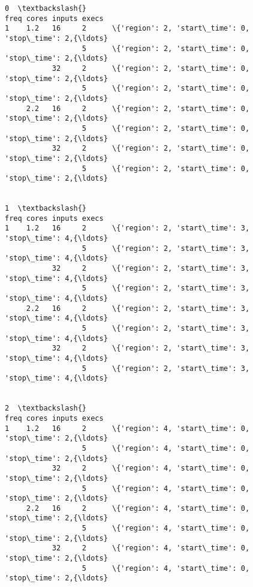 \documentclass[11pt]{article}
\begin{document}
    \begin{Verbatim}[commandchars=\\\{\}]
                                                                         0  \textbackslash{}
freq cores inputs execs
1    1.2   16     2      \{'region': 2, 'start\_time': 0, 'stop\_time': 2,{\ldots}
                  5      \{'region': 2, 'start\_time': 0, 'stop\_time': 2,{\ldots}
           32     2      \{'region': 2, 'start\_time': 0, 'stop\_time': 2,{\ldots}
                  5      \{'region': 2, 'start\_time': 0, 'stop\_time': 2,{\ldots}
     2.2   16     2      \{'region': 2, 'start\_time': 0, 'stop\_time': 2,{\ldots}
                  5      \{'region': 2, 'start\_time': 0, 'stop\_time': 2,{\ldots}
           32     2      \{'region': 2, 'start\_time': 0, 'stop\_time': 2,{\ldots}
                  5      \{'region': 2, 'start\_time': 0, 'stop\_time': 2,{\ldots}

                                                                         1  \textbackslash{}
freq cores inputs execs
1    1.2   16     2      \{'region': 2, 'start\_time': 3, 'stop\_time': 4,{\ldots}
                  5      \{'region': 2, 'start\_time': 3, 'stop\_time': 4,{\ldots}
           32     2      \{'region': 2, 'start\_time': 3, 'stop\_time': 4,{\ldots}
                  5      \{'region': 2, 'start\_time': 3, 'stop\_time': 4,{\ldots}
     2.2   16     2      \{'region': 2, 'start\_time': 3, 'stop\_time': 4,{\ldots}
                  5      \{'region': 2, 'start\_time': 3, 'stop\_time': 4,{\ldots}
           32     2      \{'region': 2, 'start\_time': 3, 'stop\_time': 4,{\ldots}
                  5      \{'region': 2, 'start\_time': 3, 'stop\_time': 4,{\ldots}

                                                                         2  \textbackslash{}
freq cores inputs execs
1    1.2   16     2      \{'region': 4, 'start\_time': 0, 'stop\_time': 2,{\ldots}
                  5      \{'region': 4, 'start\_time': 0, 'stop\_time': 2,{\ldots}
           32     2      \{'region': 4, 'start\_time': 0, 'stop\_time': 2,{\ldots}
                  5      \{'region': 4, 'start\_time': 0, 'stop\_time': 2,{\ldots}
     2.2   16     2      \{'region': 4, 'start\_time': 0, 'stop\_time': 2,{\ldots}
                  5      \{'region': 4, 'start\_time': 0, 'stop\_time': 2,{\ldots}
           32     2      \{'region': 4, 'start\_time': 0, 'stop\_time': 2,{\ldots}
                  5      \{'region': 4, 'start\_time': 0, 'stop\_time': 2,{\ldots}


\end{Verbatim}
\end{document}
